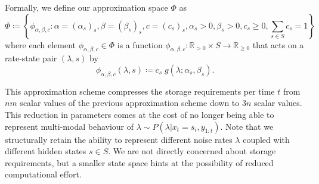 \documentclass[twoside, 11pt]{article}
\newcommand{\reals}[0] {\mathbb{R}}
\begin{document}
Formally, we define our approximation space $\Phi$ as
\begin{equation}
\Phi \coloneqq \left\{ \phi_{\alpha, \beta, c} : \alpha = (\alpha_s)_s, \beta = (\beta_s)_s, c = (c_s)_s, \alpha_s > 0, \beta_s > 0, c_s \geq 0, \sum_{s \in S} c_s = 1 \right\}
\end{equation}
where each element $\phi_{\alpha, \beta, c} \in \Phi$ is a function $\phi_{\alpha, \beta, c} : \reals_{>0} \times S \rightarrow \reals_{\geq 0}$ that acts on a rate-state pair $(\lambda, s)$ by
\begin{equation}
\phi_{\alpha, \beta, c} (\lambda, s) \coloneqq c_s \; g(\lambda ; \alpha_s, \beta_s) .
\end{equation}

This approximation scheme compresses the storage requirements per time $t$ from $n m$ scalar values of the previous approximation scheme down to $3 n$ scalar values. This reduction in parameters comes at the cost of no longer being able to represent multi-modal behaviour of $\lambda \sim P(\lambda | x_t=s_i, y_{1:t})$. Note that we structurally retain the ability to represent different noise rates $\lambda$ coupled with different hidden states $s \in S$. We are not directly concerned about storage requirements, but a smaller state space hints at the possibility of reduced computational effort.



\end{document}
